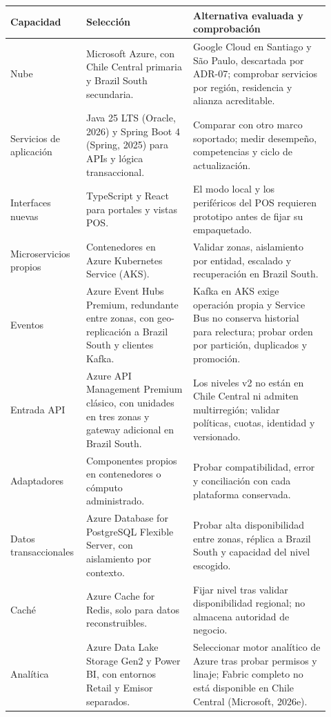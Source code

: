\documentclass[11pt]{article}
\begin{document}
\begin{longtable}{@{}p{0.19\linewidth}p{0.32\linewidth}p{0.41\linewidth}@{}}
\toprule Capacidad & Selección & Alternativa evaluada y comprobación \\
\midrule\endhead\bottomrule\endlastfoot
Nube & Microsoft Azure, con Chile Central primaria y Brazil South secundaria. & Google Cloud en Santiago y São Paulo, descartada por ADR-07; comprobar servicios por región, residencia y alianza acreditable. \\
Servicios de aplicación & Java 25 LTS (Oracle, 2026) y Spring Boot 4 (Spring, 2025) para APIs y lógica transaccional. & Comparar con otro marco soportado; medir desempeño, competencias y ciclo de actualización. \\
Interfaces nuevas & TypeScript y React para portales y vistas POS. & El modo local y los periféricos del POS requieren prototipo antes de fijar su empaquetado. \\
Microservicios propios & Contenedores en Azure Kubernetes Service (AKS). & Validar zonas, aislamiento por entidad, escalado y recuperación en Brazil South. \\
Eventos & Azure Event Hubs Premium, redundante entre zonas, con geo-replicación a Brazil South y clientes Kafka. & Kafka en AKS exige operación propia y Service Bus no conserva historial para relectura; probar orden por partición, duplicados y promoción. \\
Entrada API & Azure API Management Premium clásico, con unidades en tres zonas y gateway adicional en Brazil South. & Los niveles v2 no están en Chile Central ni admiten multirregión; validar políticas, cuotas, identidad y versionado. \\
Adaptadores & Componentes propios en contenedores o cómputo administrado. & Probar compatibilidad, error y conciliación con cada plataforma conservada. \\
Datos transaccionales & Azure Database for PostgreSQL Flexible Server, con aislamiento por contexto. & Probar alta disponibilidad entre zonas, réplica a Brazil South y capacidad del nivel escogido. \\
Caché & Azure Cache for Redis, solo para datos reconstruibles. & Fijar nivel tras validar disponibilidad regional; no almacena autoridad de negocio. \\
Analítica & Azure Data Lake Storage Gen2 y Power BI, con entornos Retail y Emisor separados. & Seleccionar motor analítico de Azure tras probar permisos y linaje; Fabric completo no está disponible en Chile Central (Microsoft, 2026e). \\

\end{longtable}
\end{document}
